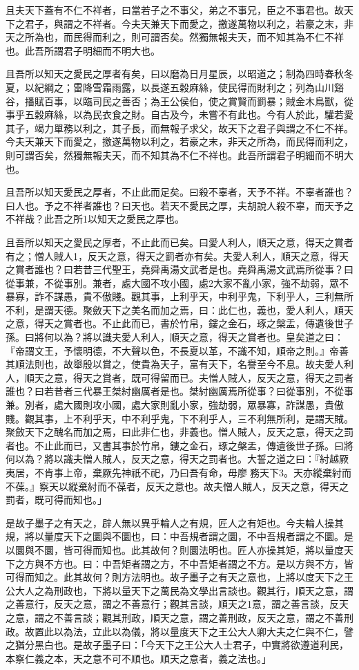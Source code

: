 \begin{pinyinscope}
且夫天下蓋有不仁不祥者，曰當若子之不事父，弟之不事兄，臣之不事君也。故天下之君子，與謂之不祥者。今夫天兼天下而愛之，撽遂萬物以利之，若豪之末，非天之所為也，而民得而利之，則可謂否矣。然獨無報夫天，而不知其為不仁不祥也。此吾所謂君子明細而不明大也。

且吾所以知天之愛民之厚者有矣，曰以磨為日月星辰，以昭道之；制為四時春秋冬夏，以紀綱之；雷降雪霜雨露，以長遂五穀麻絲，使民得而財利之；列為山川谿谷，播賦百事，以臨司民之善否；為王公侯伯，使之賞賢而罰暴；賊金木鳥獸，從事乎五穀麻絲，以為民衣食之財。自古及今，未嘗不有此也。今有人於此，驩若愛其子，竭力單務以利之，其子長，而無報子求父，故天下之君子與謂之不仁不祥。今夫天兼天下而愛之，撽遂萬物以利之，若豪之末，非天之所為，而民得而利之，則可謂否矣，然獨無報夫天，而不知其為不仁不祥也。此吾所謂君子明細而不明大也。

且吾所以知天愛民之厚者，不止此而足矣。曰殺不辜者，天予不祥。不辜者誰也？曰人也。予之不祥者誰也？曰天也。若天不愛民之厚，夫胡說人殺不辜，而天予之不祥哉？此吾之所1以知天之愛民之厚也。

且吾所以知天之愛民之厚者，不止此而已矣。曰愛人利人，順天之意，得天之賞者有之；憎人賊人1，反天之意，得天之罰者亦有矣。夫愛人利人，順天之意，得天之賞者誰也？曰若昔三代聖王，堯舜禹湯文武者是也。堯舜禹湯文武焉所從事？曰從事兼，不從事別。兼者，處大國不攻小國，處2大家不亂小家，強不劫弱，眾不暴寡，詐不謀愚，貴不傲賤。觀其事，上利乎天，中利乎鬼，下利乎人，三利無所不利，是謂天德。聚斂天下之美名而加之焉，曰：此仁也，義也，愛人利人，順天之意，得天之賞者也。不止此而已，書於竹帛，鏤之金石，琢之槃盂，傳遺後世子孫。曰將何以為？將以識夫愛人利人，順天之意，得天之賞者也。皇矣道之曰：『帝謂文王，予懷明德，不大聲以色，不長夏以革，不識不知，順帝之則。』帝善其順法則也，故舉殷以賞之，使貴為天子，富有天下，名譽至今不息。故夫愛人利人，順天之意，得天之賞者，既可得留而已。夫憎人賊人，反天之意，得天之罰者誰也？曰若昔者三代暴王桀紂幽厲者是也。桀紂幽厲焉所從事？曰從事別，不從事兼。別者，處大國則攻小國，處大家則亂小家，強劫弱，眾暴寡，詐謀愚，貴傲賤。觀其事，上不利乎天，中不利乎鬼，下不利乎人，三不利無所利，是謂天賊。聚斂天下之醜名而加之焉，曰此非仁也，非義也。憎人賊人，反天之意，得天之罰者也。不止此而已，又書其事於竹帛，鏤之金石，琢之槃盂，傳遺後世子孫。曰將何以為？將以識夫憎人賊人，反天之意，得天之罰者也。大誓之道之曰：『紂越厥夷居，不肯事上帝，棄厥先神祇不祀，乃曰吾有命，毋廖𠏿務天下3。天亦縱棄紂而不葆。』察天以縱棄紂而不葆者，反天之意也。故夫憎人賊人，反天之意，得天之罰者，既可得而知也。」

是故子墨子之有天之，辟人無以異乎輪人之有規，匠人之有矩也。今夫輪人操其規，將以量度天下之圜與不圜也，曰：中吾規者謂之圜，不中吾規者謂之不圜。是以圜與不圜，皆可得而知也。此其故何？則圜法明也。匠人亦操其矩，將以量度天下之方與不方也。曰：中吾矩者謂之方，不中吾矩者謂之不方。是以方與不方，皆可得而知之。此其故何？則方法明也。故子墨子之有天之意也，上將以度天下之王公大人之為刑政也，下將以量天下之萬民為文學出言談也。觀其行，順天之意，謂之善意行，反天之意，謂之不善意行；觀其言談，順天之1意，謂之善言談，反天之意，謂之不善言談；觀其刑政，順天之意，謂之善刑政，反天之意，謂之不善刑政。故置此以為法，立此以為儀，將以量度天下之王公大人卿大夫之仁與不仁，譬之猶分黑白也。是故子墨子曰：「今天下之王公大人士君子，中實將欲遵道利民，本察仁義之本，天之意不可不順也。順天之意者，義之法也。」


\end{pinyinscope}
